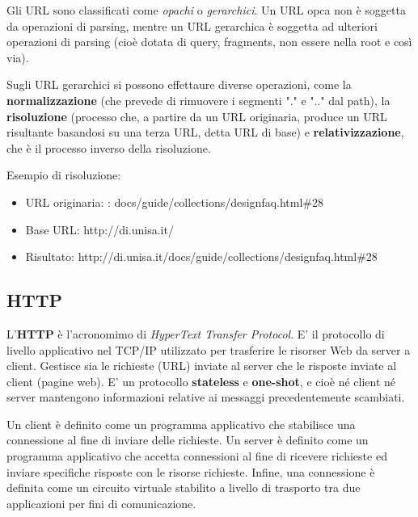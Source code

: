 Gli URL sono classificati come \textit{opachi} o \textit{gerarchici}. Un URL opca non è soggetta da operazioni di parsing, mentre un URL gerarchica è soggetta ad ulteriori operazioni di parsing (cioè dotata di query, fragments, non essere nella root e così via). 

\vspace{3mm}

Sugli URL gerarchici si possono effettaure diverse operazioni, come la \textbf{normalizzazione} (che prevede di rimuovere i segmenti "." e ".." dal path), la \textbf{risoluzione} (processo che, a partire da un URL originaria, produce un URL risultante basandosi su una terza URL, detta URL di base) e \textbf{relativizzazione}, che è il processo inverso della risoluzione.

\vspace{3mm}

Esempio di risoluzione:
\begin{itemize}
    \item URL originaria: : docs/guide/collections/designfaq.html\#28
    \item Base URL: http://di.unisa.it/
    \item Risultato: http://di.unisa.it/docs/guide/collections/designfaq.html\#28
\end{itemize}

\subsection{HTTP}

L'\textbf{HTTP} è l'acronomimo di \textit{HyperText Transfer Protocol}. E' il protocollo di livello applicativo nel TCP/IP utilizzato per trasferire le risorser Web da server a client. Gestisce sia le richieste (URL) inviate al server che le risposte inviate al client (pagine web). E' un protocollo \textbf{stateless} e \textbf{one-shot}, e cioè né client né server mantengono informazioni relative ai messaggi precedentemente scambiati.

\vspace{3mm}

Un client è definito come un programma applicativo che stabilisce una connessione al fine di inviare delle richieste.
Un server è definito come un programma applicativo che accetta connessioni al fine di ricevere richieste ed inviare specifiche risposte con le risorse richieste.
Infine, una connessione è definita come un circuito virtuale stabilito a livello di trasporto tra due applicazioni per
fini di comunicazione.


